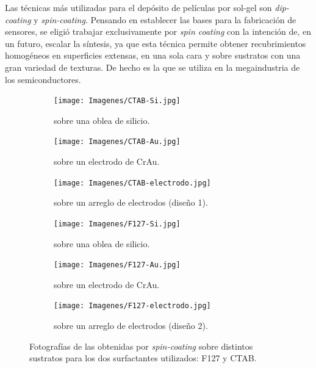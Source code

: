 		Las técnicas más utilizadas para el depósito de películas por sol-gel son \textit{dip-coating} y \textit{spin-coating}. 
		Pensando en establecer las bases para la fabricación de sensores, se eligió trabajar exclusivamente por \textit{spin coating} con la intención de, en un futuro, escalar la síntesis, ya que esta técnica permite obtener recubrimientos homogéneos en superficies extensas, en una sola cara y sobre sustratos con una gran variedad de texturas. De hecho es la que se utiliza en la megaindustria de los semiconductores.\cite{Franssila2004,Jaeger2001} 		

			\begin{figure}[h!]
	 	   	    \begin{subfigure}[t]{0.325\textwidth}
		        	\texttt{[image: Imagenes/CTAB-Si.jpg]}
		       		\caption{\pdmC\space sobre una oblea de silicio.}
		         	\label{fig:F127_vidrio}
		     		\end{subfigure}
	     		\begin{subfigure}[t]{0.325\textwidth}
		        	\texttt{[image: Imagenes/CTAB-Au.jpg]}
		       		\caption{\pdmC\space sobre un electrodo de Cr\textbar Au.}
		         	\label{fig:F127_silicio}
		     		\end{subfigure}
	     		\begin{subfigure}[t]{0.325\textwidth}
		        	\texttt{[image: Imagenes/CTAB-electrodo.jpg]}
		       		\caption{\pdmC\space sobre un arreglo de electrodos (diseño 1).}
		         	\label{fig:F127_Au}
		     		\end{subfigure}
	 	   	    \begin{subfigure}[t]{0.325\textwidth}
		        	\texttt{[image: Imagenes/F127-Si.jpg]}
		       		\caption{\pdmF\space sobre una oblea de silicio.}
		         	\label{fig:CTAB_vidrio}
		     		\end{subfigure}
	     		\begin{subfigure}[t]{0.325\textwidth}
		        	\texttt{[image: Imagenes/F127-Au.jpg]}
		       		\caption{\pdmF\space sobre un electrodo de Cr\textbar Au.}
		         	\label{fig:CTAB_silicio}
		     		\end{subfigure}
	     		\begin{subfigure}[t]{0.325\textwidth}
		        	\texttt{[image: Imagenes/F127-electrodo.jpg]}
		       		\caption{\pdmF\space sobre un arreglo de electrodos (diseño 2).}
		         	\label{fig:CTAB_Au}
		     		\end{subfigure}
	     		\caption[Películas mesoporosas sobre distintos soportes.]{Fotografías de las \pdm\space obtenidas por \textit{spin-coating }sobre distintos sustratos para los dos surfactantes utilizados: F127 y CTAB.}
	     		\label{fig:fotos_films}
	     	   	\end{figure}

